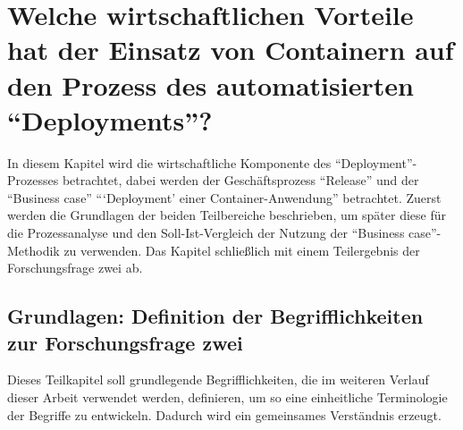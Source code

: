 \chapter[Forschungsfrage 2]{Welche wirtschaftlichen Vorteile hat der Einsatz von Containern auf den Prozess des automatisierten \enquote{Deployments}?} \label{ff2}
In diesem Kapitel wird die wirtschaftliche Komponente des \enquote{Deployment}-Prozesses betrachtet, dabei werden der Geschäftsprozess \enquote{Release} und der \enquote{Business case} \enquote{\enquote{Deployment} einer Container-Anwendung}  betrachtet. Zuerst werden die Grundlagen der beiden Teilbereiche beschrieben, um später diese für die Prozessanalyse und den Soll-Ist-Vergleich der Nutzung der \enquote{Business case}-Methodik zu verwenden. Das Kapitel schließlich mit einem Teilergebnis der Forschungsfrage zwei ab.

\section{Grundlagen: Definition der Begrifflichkeiten zur Forschungsfrage zwei}
Dieses Teilkapitel soll grundlegende Begrifflichkeiten, die im weiteren Verlauf dieser Arbeit verwendet werden, definieren, um so eine einheitliche Terminologie der Begriffe zu entwickeln. Dadurch wird ein gemeinsames Verständnis erzeugt.


